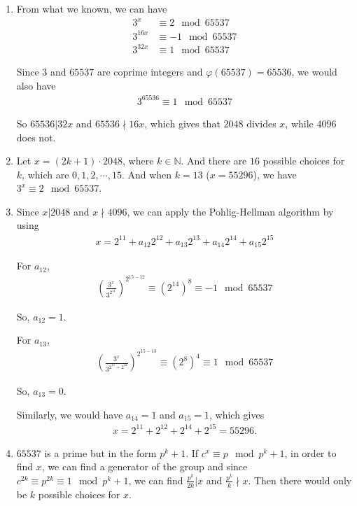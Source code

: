\documentclass[a4paper,12pt]{journal}
\begin{document}
		\begin{enumerate}
			\item From what we known, we can have
			\begin{align*}
				3^{x} &\equiv 2 \mod 65537 \\
				3^{16x} &\equiv -1 \mod 65537 \\
				3^{32x} &\equiv 1 \mod 65537
			\end{align*}
			\par Since $3$ and $65537$ are coprime integers and $\varphi(65537) = 65536$, we would also have
			\begin{align*}
				3^{65536} \equiv 1 \mod 65537
			\end{align*}
			\par So $65536 \vert 32x$ and $65536 \nmid 16x$, which gives that $2048$ divides $x$, while $4096$ does not.
			
			\item Let $x = (2k + 1)\cdot 2048$, where $k \in \mathbb{N}$. And there are $16$ possible choices for $k$, which are $0, 1, 2, \cdots, 15$. And when $k = 13$ ($x = 55296$), we have $3^{x} \equiv 2 \mod 65537$.
			
			\item Since $x\vert 2048$ and $x \nmid 4096$, we can apply the Pohlig-Hellman algorithm by using
			\begin{align*}
				x = 2^{11} + a_{12}2^{12} + a_{13}2^{13} + a_{14}2^{14} + a_{15}2^{15}
			\end{align*}
			\par For $a_{12}$,
			\begin{align*}
				\left(\frac{3^{x}}{3^{2^{11}}}\right)^{2^{15-12}} \equiv (2^{14})^8 \equiv -1 \mod 65537
			\end{align*}
			\par So, $a_{12} = 1$.
			\par For $a_{13}$,
			\begin{align*}
				\left(\frac{3^{x}}{3^{2^{11}+2^{12}}}\right)^{2^{15-13}} \equiv (2^{8})^4 \equiv 1 \mod 65537
			\end{align*}
			\par So, $a_{13} = 0$.
			\par Similarly, we would have $a_{14} = 1$ and $a_{15} = 1$, which gives
			\begin{align*}
				x = 2^{11} + 2^{12} + 2^{14} + 2^{15} = 55296.
			\end{align*}
			
			\item $65537$ is a prime but in the form $p^{k} + 1$. If $c^{x} \equiv p \mod p^{k} + 1$, in order to find $x$, we can find a generator of the group and since $c^{2k} \equiv p^{2k} \equiv 1 \mod p^{k} + 1$, we can find $\frac{p^{k}}{2k} \vert x$ and $\frac{p^{k}}{k} \nmid x$. Then there would only be $k$ possible choices for $x$.
		\end{enumerate}
 
\end{document}
